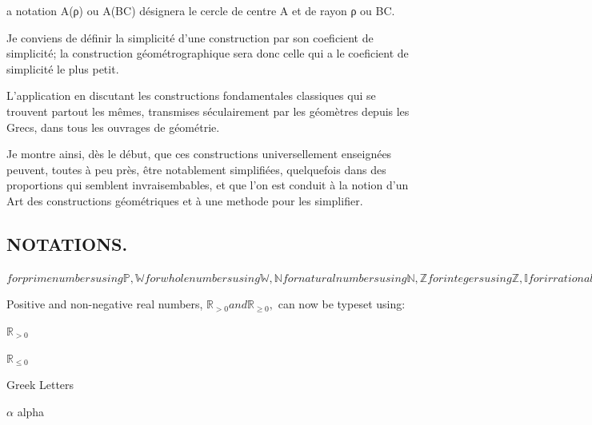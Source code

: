 \documentclass[12pt,a4paper,twocolumn]{book} %
\begin{document}
a notation A(ρ) ou A(BC) désignera le cercle de centre A et de rayon ρ ou BC.


Je conviens de définir la simplicité d'une construction par son coeficient de simplicité; la construction géométrographique sera donc celle qui a le coeficient de simplicité le plus petit.




 L'application en discutant les constructions fondamentales classiques qui se trouvent partout
les mêmes, transmises séculairement par les géomètres depuis
les Grecs, dans tous les ouvrages de géométrie.


Je montre ainsi, dès le début, que ces constructions universellement enseignées peuvent, toutes à peu près, être notablement simplifiées, quelquefois dans des proportions qui semblent invraisembables, et que l'on est conduit à la notion d'un Art des constructions géométriques et à une methode pour les simplifier.

\subsection{NOTATIONS.}
$ for prime numbers using \mathbb{P},
\mathbb{W} for whole numbers using \mathbb{W},
\mathbb{N} for natural numbers using \mathbb{N},
\mathbb{Z} for integers using \mathbb{Z},
\mathbb{I} for irrational numbers using \mathbb{I},
\mathbb{Q} for rational numbers using \mathbb{Q},
\mathbb{R} for real numbers using \mathbb{R} and
\mathbb{C} for complex numbers using \mathbb{C}.$

Positive and non-negative real numbers, $\mathbb{R}_{>0} and \mathbb{R}_{\geq0},$ can now be typeset using:


$\mathbb{R}_{>0}$

$\mathbb{R}_{\leq 0}$

Greek Letters

$\alpha$ 	alpha

\end{document}
